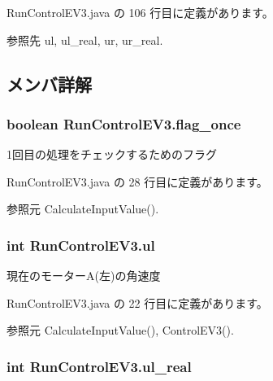  Run\-Control\-E\-V3.\-java の 106 行目に定義があります。



参照先 ul, ul\-\_\-real, ur, ur\-\_\-real.



\subsection{メンバ詳解}
\subsubsection[{flag\-\_\-once}]{\setlength{\rightskip}{0pt plus 5cm}boolean Run\-Control\-E\-V3.\-flag\-\_\-once\hspace{0.3cm}{\ttfamily [static]}}\label{class_run_control_e_v3_aa497a02d040094b3a73ebaee31469f54}


1回目の処理をチェックするためのフラグ 



 Run\-Control\-E\-V3.\-java の 28 行目に定義があります。



参照元 Calculate\-Input\-Value().

\subsubsection[{ul}]{\setlength{\rightskip}{0pt plus 5cm}int Run\-Control\-E\-V3.\-ul\hspace{0.3cm}{\ttfamily [static]}}\label{class_run_control_e_v3_a31adcc7284b47f38641a8e735c651ac7}


現在のモーター\-A(左)の角速度 



 Run\-Control\-E\-V3.\-java の 22 行目に定義があります。



参照元 Calculate\-Input\-Value(), Control\-E\-V3().

\subsubsection[{ul\-\_\-real}]{\setlength{\rightskip}{0pt plus 5cm}int Run\-Control\-E\-V3.\-ul\-\_\-real\hspace{0.3cm}{\ttfamily [static]}}\label{class_run_control_e_v3_abf9d83adb525b4201e389d54b9db1522}



